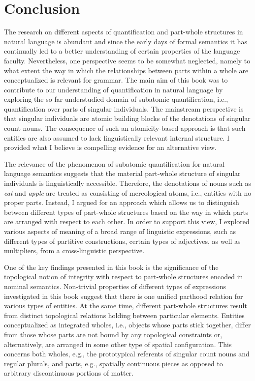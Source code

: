 \chapter{Conclusion}\label{ch:conclusion}

The research on different aspects of quantification and part-whole structures in natural language is abundant and since the early days of formal semantics it has continually led to a better understanding of certain properties of the language faculty. Nevertheless, one perspective seems to be somewhat neglected, namely to what extent the way in which the relationships between parts within a whole are conceptualized is relevant for grammar. The main aim of this book was to contribute to our understanding of quantification in natural language by exploring the so far understudied domain of subatomic quantification, i.e., quantification over parts of singular individuals. The mainstream perspective is that singular individuals are atomic building blocks of the denotations of singular count nouns. The consequence of such an atomicity-based approach is that such entities are also assumed to lack linguistically relevant internal structure. I provided what I believe is compelling evidence for an alternative view. 

The relevance of the phenomenon of subatomic quantification for natural language semantics suggests that the material part-whole structure of singular individuals is linguistically accessible. Therefore, the denotations of nouns such as \textit{cat} and \textit{apple} are treated as consisting of mereological atoms, i.e., entities with no proper parts. Instead, I argued for an approach which allows us to distinguish between different types of part-whole structures based on the way in which parts are arranged with respect to each other. In order to support this view, I explored various aspects of meaning of a broad range of linguistic expressions, such as different types of partitive constructions, certain types of adjectives, as well as multipliers, from a cross-linguistic perspective. 

One of the key findings presented in this book is the significance of the topological notion of integrity with respect to part-whole structures encoded in nominal semantics. Non-trivial properties of different types of expressions investigated in this book suggest that there is one unified parthood relation for various types of entities. At the same time, different part-whole structures result from distinct topological relations holding between particular elements. Entities conceptualized as integrated wholes, i.e., objects whose parts stick together, differ from those whose parts are not bound by any topological constraints or, alternatively, are arranged in some other type of spatial configuration. This concerns both wholes, e.g., the prototypical referents of singular count nouns and regular plurals, and parts, e.g., spatially continuous pieces as opposed to arbitrary discontinuous portions of matter. 


